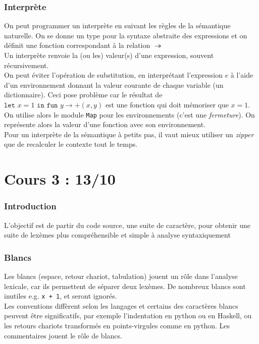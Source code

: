 \documentclass{cours}
\begin{document}
\section{Interprète}
On peut programmer un interprète en suivant les règles de la sémantique naturelle. On se donne un type pour la syntaxe abstraite des expressions et on définit une fonction correspondant à la relation $\twoheadrightarrow$\\
Un interprète renvoie la (ou les) valeur(s) d'une expression, souvent récursivement.\\
On peut éviter l'opération de substitution, en interprétant l'expression $e$ à l'aide d'un environnement donnant la valeur courante de chaque variable (un dictionnaire). Ceci pose problème car le résultat de $\texttt{let } x = 1 \texttt{ in fun } y \rightarrow +(x, y)$ est une fonction qui doit \og mémoriser \fg que $x = 1$.\\
On utilise alors le module \texttt{Map} pour les environnements (c'est une \textit{fermeture}). On représente alors la valeur d'une fonction avec son environnement. \\
Pour un interprète de la sémantique à petits pas, il vaut mieux utiliser un \textit{zipper} que de recalculer le contexte tout le temps.

\newpage
\part[Analyse Lexicale]{Cours 3 : 13/10}
\localtableofcontents
\section*{Introduction}
L'objectif est de partir du code source, une suite de caractère, pour obtenir une suite de lexèmes plus compréhensible et simple à analyse syntaxiquement

\section{Blancs}
Les blancs (espace, retour chariot, tabulation) jouent un rôle dans l'analyse lexicale, car ils permettent de séparer deux lexèmes. De nombreux blancs sont inutiles e.g. \texttt{x + 1}, et seront ignorés.\\
Les conventions diffèrent selon les langages et certains des caractères blancs peuvent être significatifs, par exemple l'indentation en python ou en Haskell, ou les retours chariots transformés en points-virgules comme en python. Les commentaires jouent le rôle de blancs.
\end{document}
